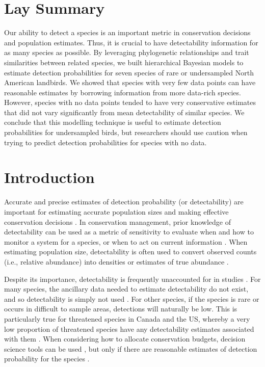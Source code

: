\documentclass[12pt]{article}
\begin{document}
\section{Lay Summary}
\par Our ability to detect a species is an important metric in conservation decisions and population estimates. 
Thus, it is crucial to have detectability information for as many species as possible.
By leveraging phylogenetic relationships and trait similarities between related species, we built hierarchical Bayesian models to estimate detection probabilities for seven species of rare or undersampled North American landbirds.
We showed that species with very few data points can have reasonable estimates by borrowing information from more data-rich species.
However, species with no data points tended to have very conservative estimates that did not vary significantly from mean detectability of similar species.
We conclude that this modelling technique is useful to estimate detection probabilities for undersampled birds, but researchers should use caution when trying to predict detection probabilities for species with no data.

\section{Introduction}

\par Accurate and precise estimates of detection probability (or detectability) are important for estimating accurate population sizes and making effective conservation decisions \citep{bennett_how_2024}.
In conservation management, prior knowledge of detectability can be used as a metric of sensitivity to evaluate when and how to monitor a system for a species, or when to act on current information \citep{canessa_when_2015, bennett_when_2018}. 
When estimating population size, detectability is often used to convert observed counts (i.e., relative abundance) into densities or estimates of true abundance \citep{solymos_calibrating_2013, johnson_defense_2008}.

\par Despite its importance, detectability is frequently unaccounted for in studies \citep{bennett_how_2024}. 
For many species, the ancillary data needed to estimate detectability do not exist, and so detectability is simply not used \citep{bennett_how_2024}.
For other species, if the species is rare or occurs in difficult to sample areas, detections will naturally be low.
This is particularly true for threatened species in Canada and the US, whereby a very low proportion of threatened species have any detectability estimates associated with them \citep{bennett_how_2024}.
When considering how to allocate conservation budgets, decision science tools can be used \citep{canessa_when_2015, binley_minimizing_2023}, but only if there are reasonable estimates of detection probability for the species \citep{bennett_how_2024}.
\end{document}
